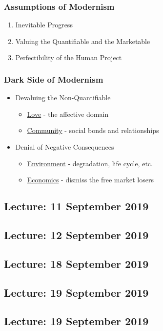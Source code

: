 \documentclass[11pt]{article}
\begin{document}
\subsubsection{Assumptions of Modernism}
\begin{enumerate}
\item Inevitable Progress
\item Valuing the Quantifiable and the Marketable
\item Perfectibility of the Human Project
\end{enumerate}

\subsubsection{Dark Side of Modernism}
\begin{itemize}
\item Devaluing the Non-Quantifiable
\begin{itemize}
\item \underline{Love} - the affective domain
\item \underline{Community} - social bonds and relationships
\end{itemize}
\item Denial of Negative Consequences
\begin{itemize}
\item \underline{Environment} - degradation, life cycle, etc.
\item \underline{Economics} - dismiss the free market losers
\end{itemize}
\end{itemize}

\subsection{Lecture: 11 September 2019}
\subsection{Lecture: 12 September 2019}
\subsection{Lecture: 18 September 2019}
\subsection{Lecture: 19 September 2019}
\subsection{Lecture: 19 September 2019}
\end{document}
